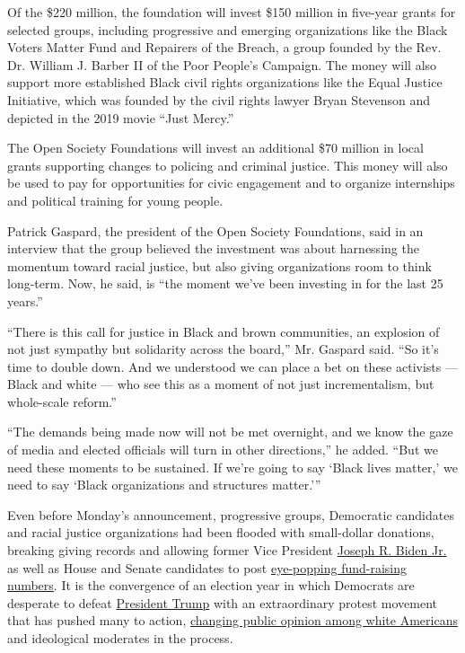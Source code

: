 Of the \$220 million, the foundation will invest \$150 million in
five-year grants for selected groups, including progressive and emerging
organizations like the Black Voters Matter Fund and Repairers of the
Breach, a group founded by the Rev. Dr. William J. Barber II of the Poor
People's Campaign. The money will also support more established Black
civil rights organizations like the Equal Justice Initiative, which was
founded by the civil rights lawyer Bryan Stevenson and depicted in the
2019 movie ``Just Mercy.''

The Open Society Foundations will invest an additional \$70 million in
local grants supporting changes to policing and criminal justice. This
money will also be used to pay for opportunities for civic engagement
and to organize internships and political training for young people.

Patrick Gaspard, the president of the Open Society Foundations, said in
an interview that the group believed the investment was about harnessing
the momentum toward racial justice, but also giving organizations room
to think long-term. Now, he said, is ``the moment we've been investing
in for the last 25 years.''

``There is this call for justice in Black and brown communities, an
explosion of not just sympathy but solidarity across the board,'' Mr.
Gaspard said. ``So it's time to double down. And we understood we can
place a bet on these activists --- Black and white --- who see this as a
moment of not just incrementalism, but whole-scale reform.''

``The demands being made now will not be met overnight, and we know the
gaze of media and elected officials will turn in other directions,'' he
added. ``But we need these moments to be sustained. If we're going to
say `Black lives matter,' we need to say `Black organizations and
structures matter.'''

Even before Monday's announcement, progressive groups, Democratic
candidates and racial justice organizations had been flooded with
small-dollar donations, breaking giving records and allowing former Vice
President
\href{https://www.nytimes.com/interactive/2020/us/elections/joe-biden.html}{Joseph
R. Biden Jr.} as well as House and Senate candidates to post
\href{https://www.nytimes.com/2020/07/01/us/politics/trump-fundraising-2020.html}{eye-popping
fund-raising numbers}. It is the convergence of an election year in
which Democrats are desperate to defeat
\href{https://www.nytimes.com/interactive/2020/us/elections/donald-trump.html}{President
Trump} with an extraordinary protest movement that has pushed many to
action,
\href{https://www.nytimes.com/interactive/2020/06/10/upshot/black-lives-matter-attitudes.html}{changing
public opinion among white Americans} and ideological moderates in the
process.

